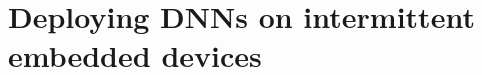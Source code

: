 \chapter{Deploying DNNs on intermittent embedded devices}
\label{chapter:sonic}

\newcommand{\metric}{IMpJ\xspace}
\newcommand{\genesis}{{\sc Genesis}\xspace}
\newcommand{\tails}{{\protect\fauxsc{Tails}}\xspace}
\newcommand{\sonictails}{{\sonic}\,{\small\&}\,\tails}










